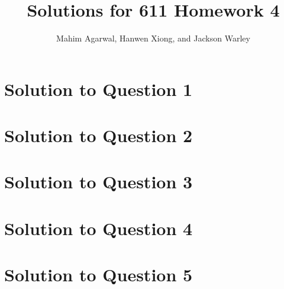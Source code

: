 \documentclass[11pt]{article}
\title{Solutions for 611 Homework 4}
\author{Mahim Agarwal, Hanwen Xiong, and Jackson Warley}
\begin{document}
\maketitle

\section{Solution to Question 1}



\section{Solution to Question 2}



\section{Solution to Question 3}



\section{Solution to Question 4}



\section{Solution to Question 5}
\end{document}
